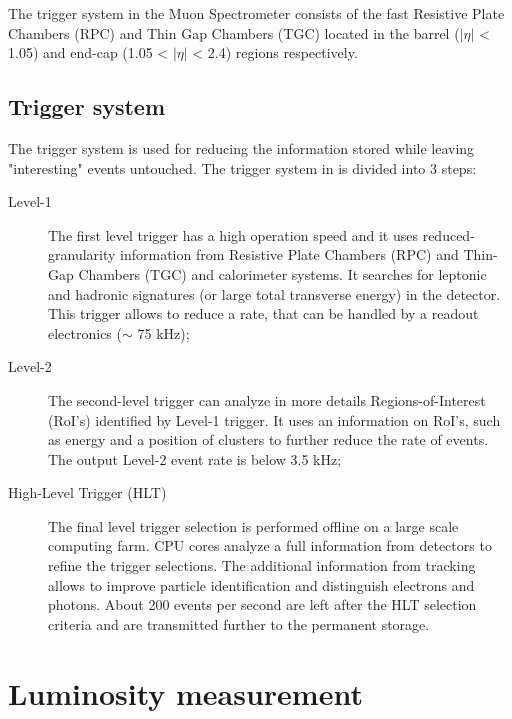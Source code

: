 The trigger system in the Muon Spectrometer consists of the fast Resistive Plate Chambers (RPC) and Thin Gap Chambers (TGC) located in the barrel ($|\eta|$ < 1.05) and end-cap (1.05 < $|\eta|$ < 2.4) regions respectively. 

\begin{figure}[!tb]
\end{figure}

\subsection{Trigger system}
The trigger system is used for reducing the information stored while leaving "interesting" events untouched. The trigger system in \atlas is divided into 3 steps:
\begin{description}
\item[Level-1] The first level trigger has a high operation speed and it uses reduced-granularity information from Resistive Plate Chambers (RPC) and Thin-Gap Chambers (TGC) and calorimeter systems. It searches for leptonic and hadronic signatures (or large total transverse energy) in the detector. This trigger allows to reduce a rate, that can be handled by a readout electronics ($\sim$ 75 kHz);
\item[Level-2] The second-level \atlas trigger can analyze in more details Regions-of-Interest (RoI's) identified by Level-1 trigger. It uses an information on RoI's, such as energy and a position of clusters to further reduce the rate of events. The output Level-2 event rate is below 3.5 kHz;
\item[High-Level Trigger (HLT)] The final level trigger selection is performed offline on a large scale computing farm. CPU cores analyze a full information from detectors to refine the trigger selections. The additional information from tracking allows to improve particle identification and distinguish electrons and photons. About 200 events per second are left after the HLT selection criteria and are transmitted further to the permanent storage.
\end{description}

\section{Luminosity measurement}

